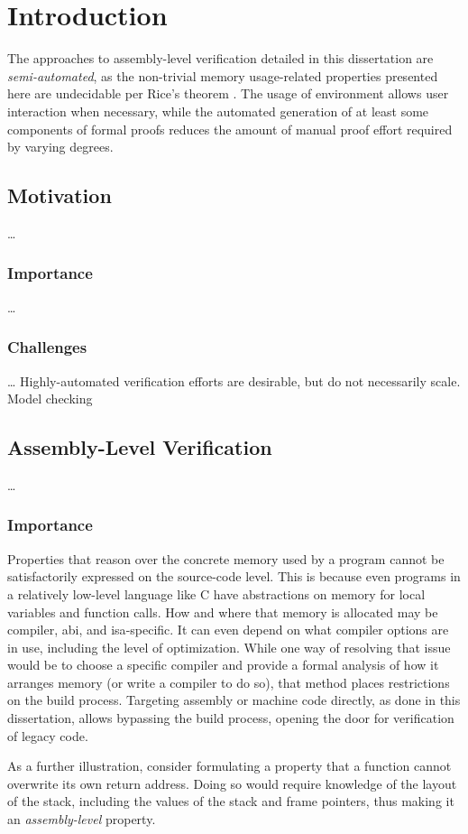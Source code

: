 \chapter{Introduction}

The approaches to assembly-level verification detailed in this dissertation%
are \emph{semi-automated},
as the non-trivial memory usage-related properties presented here are undecidable
per Rice's theorem \autocite{rice1953classes}.
The usage of  environment allows user interaction when necessary,
while the automated generation
of at least some components of formal proofs
reduces the amount of manual proof effort required by varying degrees.

\section{Motivation}
\todo\dots
\subsection{Importance}
\todo\dots
{}

\subsection{Challenges}
\todo\dots
Highly-automated verification efforts are desirable, but do not necessarily scale.
Model checking

\section{Assembly-Level Verification}
\todo\dots

\subsection{Importance}
Properties that reason over the concrete memory used by a program
cannot be satisfactorily expressed on the source-code level.
This is because even programs in a relatively low-level language like C
have abstractions on memory for local variables and function calls.
How and where that memory is allocated may be compiler, \ac{abi}, and \ac{isa}-specific.
It can even depend on what compiler options are in use,
including the level of optimization.
While one way of resolving that issue would be to choose a specific compiler
and provide a formal analysis of how it arranges memory (or write a compiler to do so),
that method places restrictions on the build process.
Targeting assembly or machine code directly, as done in this dissertation,
allows bypassing the build process, opening the door for verification of legacy code.
\begin{example}\label{ex:rop}
  As a further illustration, consider formulating a property
  that a function cannot overwrite its own return address.
  Doing so would require knowledge of the layout of the stack,
  including the values of the stack and frame pointers,
  thus making it an \emph{assembly-level} property.
\end{example}

